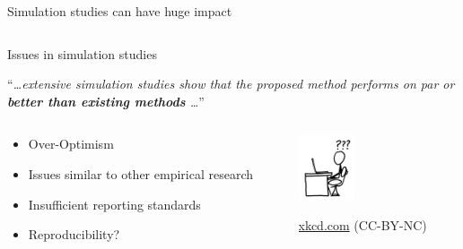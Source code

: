 \documentclass[english, 12pt, aspectratio=169]{beamer}
\begin{document}
\begin{frame}{Simulation studies can have huge impact}
\begin{block}{}
\begin{columns}
\begin{column}{0.5\textwidth}
      \end{column}
      \end{columns}
    \end{block}



\end{frame}




\begin{frame}{Issues in simulation studies}
    \begin{block}{}
      \begin{tcolorbox}[colframe=chineseBlue]
        ``\emph{\dots extensive simulation studies show that the proposed
          method performs on par or \textbf{\alert{better than existing
              methods}} \dots}''
      \end{tcolorbox}

    \end{block}
    
    \begin{block}{}
      \begin{columns}
      \begin{column}{0.65\textwidth}
      \pause
        \begin{itemize}
          \item Over-Optimism \citep[e.g.,][]{Ullmann2022}
          \pause
          \item Issues similar to other empirical research \citep{Boulesteix2020}
          \pause
          \item Insufficient reporting standards \citep[e.g.,][]{Hoaglin1975}
          \pause
          \item Reproducibility? \citep[e.g.,][]{Luijken2023}
        \end{itemize}
      \end{column}
      \begin{column}{0.35\textwidth}
      \pause
        \centering
        \includegraphics[width=0.35\textwidth]{pics/questionXKCD.png}

        {\tiny \color{gray} \href{https://xkcd.com}{xkcd.com} (CC-BY-NC)}
      \end{column}
      \end{columns}
    \end{block}
  \end{frame}
\end{document}
